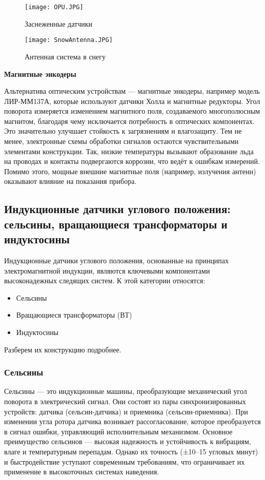   \begin{figure}[!t]
    \centering
    \texttt{[image: OPU.JPG]}
    \caption{Заснеженные датчики}
    \label{OpuInSnow}
  \end{figure}

  \begin{figure}[!t]
    \centering
    \texttt{[image: SnowAntenna.JPG]}
    \caption{Антенная система в снегу}
    \label{SnowAntenna}
  \end{figure}

  \textbf{Магнитные энкодеры}
  
  Альтернатива оптическим устройствам — магнитные энкодеры, например модель ЛИР-ММ137А, 
  которые используют датчики Холла и магнитные редукторы. Угол поворота измеряется изменением магнитного поля, создаваемого многополюсным магнитом, 
  благодаря чему исключается потребность в оптических компонентах. 
  Это значительно улучшает стойкость к загрязнениям и влагозащиту. 
  Тем не менее, электронные схемы обработки сигналов остаются чувствительными элементами конструкции. 
  Так, низкие температуры вызывают образование льда на проводах и контакты подвергаются коррозии, что ведёт к ошибкам измерений. 
  Помимо этого, мощные внешние магнитные поля (например, излучения антенн) оказывают влияние на показания прибора.

\subsection{Индукционные датчики углового положения: сельсины, вращающиеся трансформаторы и индуктосины}

Индукционные датчики углового положения, основанные на принципах электромагнитной индукции, являются ключевыми компонентами высоконадежных следящих систем. 
К этой категории относятся: 
\begin{itemize} 
  \item Сельсины 
  \item Вращающиеся трансформаторы (ВТ) 
  \item Индуктосины 
\end{itemize}

Разберем их конструкцию подробнее.

\subsubsection{Сельсины}

Сельсины — это индукционные машины, преобразующие механический угол поворота в электрический сигнал. Они состоят из пары синхронизированных устройств: датчика (сельсин-датчика) 
и приемника (сельсин-приемника). При изменении угла ротора датчика возникает рассогласование, которое преобразуется в сигнал ошибки, управляющий исполнительным механизмом.
Основное преимущество сельсинов — высокая надежность и устойчивость к вибрациям, влаге и температурным перепадам. Однако их точность (±10–15 угловых минут) 
и быстродействие уступают современным требованиям, что ограничивает их применение в высокоточных системах наведения.

